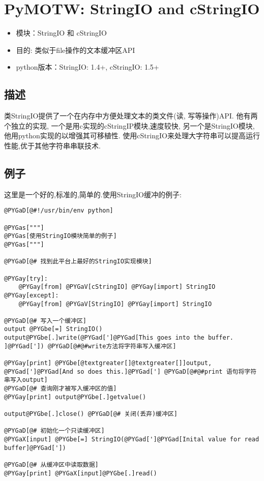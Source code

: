 \documentclass[a4paper,10pt,english]{manual}
\begin{document}
\section{PyMOTW: StringIO and cStringIO}
\begin{itemize}
\item {} 
模块：StringIO 和 cStringIO

\item {} 
目的: 类似于file操作的文本缓冲区API

\item {} 
python版本：StringIO: 1.4+, cStringIO: 1.5+

\end{itemize}


\subsection{描述}

类StringIO提供了一个在内存中方便处理文本的类文件(读, 写等操作)API. 他有两个独立的实现, 一个是用c实现的cStringIP模块,速度较快, 另一个是StringIO模块,他用python实现的以增强其可移植性. 使用cStringIO来处理大字符串可以提高运行性能,优于其他字符串串联技术.


\subsection{例子}

这里是一个好的,标准的,简单的.使用StringIO缓冲的例子:

\begin{Verbatim}[commandchars=@\[\]]
@PYGaD[@#!/usr/bin/env python]

@PYGas["""]
@PYGas[使用StringIO模块简单的例子]
@PYGas["""]

@PYGaD[@# 找到此平台上最好的StringIO实现模块]

@PYGay[try]:
    @PYGay[from] @PYGaV[cStringIO] @PYGay[import] StringIO
@PYGay[except]:
    @PYGay[from] @PYGaV[StringIO] @PYGay[import] StringIO

@PYGaD[@# 写入一个缓冲区]
output @PYGbe[=] StringIO()
output@PYGbe[.]write(@PYGad[']@PYGad[This goes into the buffer. ]@PYGad[']) @PYGaD[@#@#write方法将字符串写入缓冲区]

@PYGay[print] @PYGbe[@textgreater[]@textgreater[]]output, @PYGad[']@PYGad[And so does this.]@PYGad['] @PYGaD[@#@#print 语句将字符串写入output]
@PYGaD[@# 查询刚才被写入缓冲区的值]
@PYGay[print] output@PYGbe[.]getvalue()

output@PYGbe[.]close() @PYGaD[@# 关闭(丢弃)缓冲区]

@PYGaD[@# 初始化一个只读缓冲区]
@PYGaX[input] @PYGbe[=] StringIO(@PYGad[']@PYGad[Inital value for read buffer]@PYGad['])

@PYGaD[@# 从缓冲区中读取数据]
@PYGay[print] @PYGaX[input]@PYGbe[.]read()
\end{Verbatim}
\end{document}

